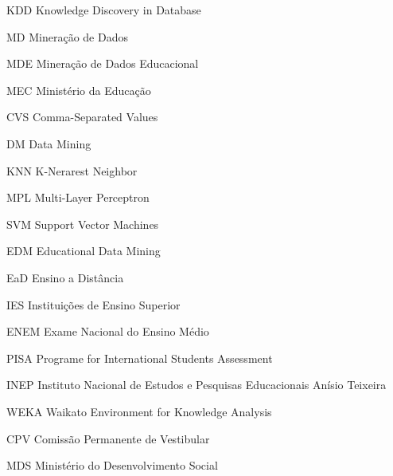\documentclass[
	12pt,				%
    oneside,			%
	a4paper,			%
	chapter=TITLE,		%
	english,			%
	brazil				%
	]{abntex2}
\begin{document}
\begin{siglas}
  \item[KDD] Knowledge Discovery in Database
  \item[MD] Mineração de Dados
  \item[MDE] Mineração de Dados Educacional
  \item[MEC] Ministério da Educação
  \item[CVS] Comma-Separated Values
  \item[DM] Data Mining
  \item[KNN] K-Nerarest Neighbor
  \item[MPL] Multi-Layer Perceptron
  \item[SVM] Support Vector Machines
  \item[EDM] Educational Data Mining
  \item[EaD] Ensino a Distância
  \item[IES] Instituições de Ensino Superior
  \item[ENEM] Exame Nacional do Ensino Médio
  \item[PISA] Programe for International Students Assessment
  \item[INEP] Instituto Nacional de Estudos e Pesquisas Educacionais Anísio Teixeira
  \item[WEKA] Waikato Environment for Knowledge Analysis
  \item[CPV] Comissão Permanente de Vestibular
  \item[MDS] Ministério do Desenvolvimento Social     
\end{siglas}


\tableofcontents*
\cleardoublepage



\textual
\end{document}
